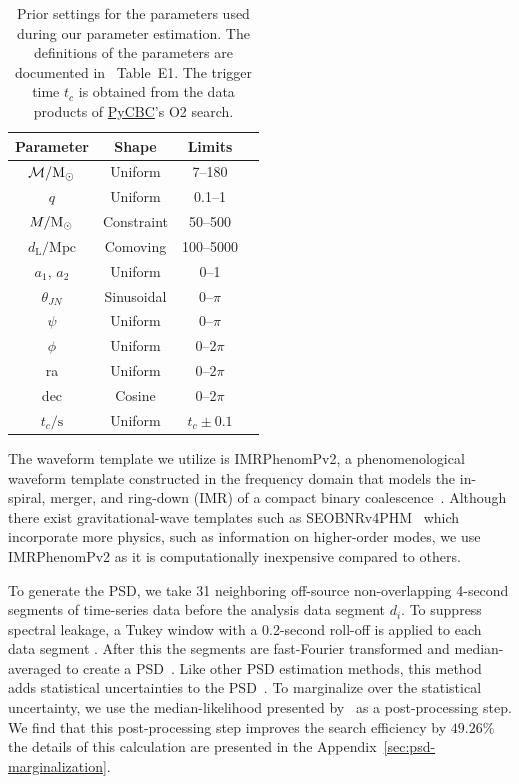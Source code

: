\documentclass[%
 nofootinbib,
 amsmath,amssymb,
 aps,
 twocolumn,
 superscriptaddress
]{revtex4-2}
\newcommand{\imrphenomp}{{\sc IMRPhenomPv2}\xspace}
\newcommand{\seob}{{\sc SEOBNRv4PHM}\xspace}
\newcommand{\pycbc}{{\sc \href{https://pycbc.org/}{{PyCBC}}}\xspace}
\newcommand{\mathcmd}[1]{{\sc \relax\ifmmode#1\else $#1$\fi}\xspace}
\newcommand{\msun}{\mathcmd{\text{M}_\odot}}
\begin{document}
\begin{table}
    \centering
    \caption{
    Prior settings for the parameters used during our parameter estimation. The definitions of the parameters are documented in \citet{bilby_gwtc}~Table~E1. The trigger time $t_c$ is obtained from the data products of \pycbc's O2 search. \label{tab:priors}} 
    \begin{tabular}{c c c c}
    \hline
    Parameter & Shape & Limits \\
    \hline
          $\mathcal{M}/\msun$           & Uniform & 7--180  \\
          $q$                           & Uniform & 0.1--1  \\
          $M/\msun$                     & Constraint & 50--500  \\
          $d_\mathrm{L}/\mathrm{Mpc}$   & Comoving & 100--5000  \\
          $a_1$, $a_2$                  & Uniform & 0--1  \\
          $\theta_{JN}$                 & Sinusoidal & 0--$\pi$  \\
          $\psi$                        & Uniform & 0--$\pi$  \\
          $\phi$                        & Uniform & 0--$2\pi$  \\
          ra                            & Uniform & 0--$2\pi$  \\
          dec                           & Cosine & 0--$2\pi$  \\
          $t_c/\mathrm{s}$              & Uniform & $t_c\pm0.1$  \\
    \hline
    \end{tabular}
\end{table}

The waveform template we utilize is \imrphenomp, a phenomenological waveform template constructed in the frequency domain that models the in-spiral, merger, and ring-down (IMR) of a compact binary coalescence~\citep{khan2016frequency}. Although there exist gravitational-wave templates such as \seob~\cite{seobnrv4phm} which incorporate more physics, such as information on higher-order modes, we use \imrphenomp as it is computationally inexpensive compared to others.

To generate the PSD, we take 31 neighboring off-source non-overlapping  4-second  segments of time-series data before the analysis data segment $d_i$. To suppress spectral leakage, a Tukey window with a 0.2-second roll-off is applied to each data segment . After this the segments are fast-Fourier transformed and median-averaged to create a PSD~\cite{ligo_psd}. Like other PSD estimation methods, this method adds statistical uncertainties to the PSD~\cite{psd_student_t, chatziioannou2019noise, Biscoveanu:2020:PhRvD}. To marginalize over the statistical uncertainty, we use the median-likelihood presented by~\citet{psd_student_t} as a post-processing step. We find that this post-processing step improves the search efficiency by $49.26\%$ the details of this calculation are presented in the Appendix~\ref{sec:psd-marginalization}.
\end{document}
